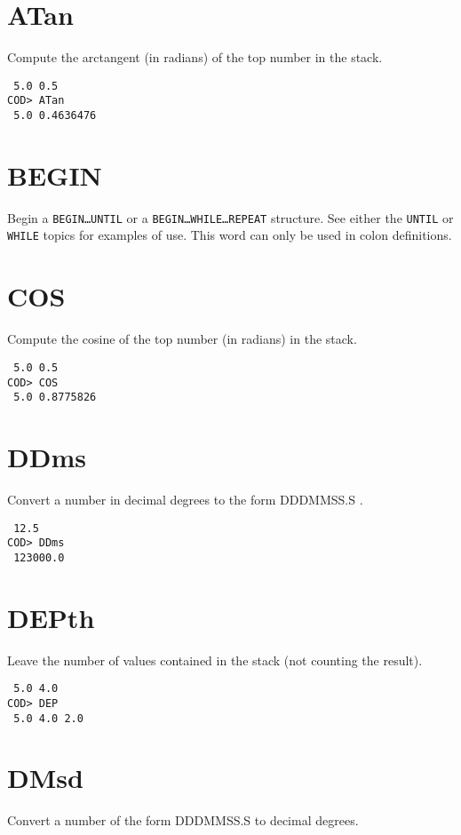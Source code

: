 \section*{ATan}
Compute the arctangent (in radians) of the top number in the stack.

\medskip
{}
\begin{verbatim}
 5.0 0.5
COD> ATan
 5.0 0.4636476
\end{verbatim}

\section*{BEGIN}
Begin a {\tt BEGIN\ldots UNTIL}
or a {\tt BEGIN\ldots WHILE\ldots REPEAT} structure.
See either the {\tt UNTIL} or {\tt WHILE} topics for examples of use.
This word can only be used in colon definitions.

\section*{COS}
Compute the cosine of the top number (in radians) in the stack.

\medskip
{}
\begin{verbatim}
 5.0 0.5
COD> COS
 5.0 0.8775826
\end{verbatim}

\section*{DDms}
Convert a number in decimal degrees to the form DDDMMSS.S .

\medskip
{}
\begin{verbatim}
 12.5
COD> DDms
 123000.0
\end{verbatim}

\section*{DEPth}
Leave the number of values contained in the stack
(not counting the result).

\medskip {}
\begin{verbatim}
 5.0 4.0
COD> DEP
 5.0 4.0 2.0
\end{verbatim}

\section*{DMsd}
Convert a number of the form DDDMMSS.S to decimal degrees.


